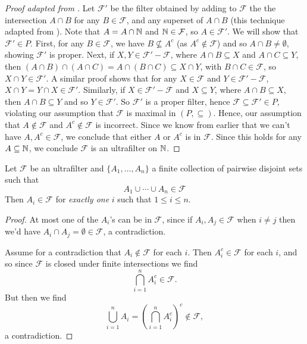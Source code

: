 \begin{proof}[Proof adapted from ]
    Let $\mathcal{F}'$ be the filter obtained by adding to $\mathcal{F}$ the the intersection $A \cap B$ for any $B \in \mathcal{F}$, and any superset of $A \cap B$ (this technique adapted from \cite[Appendix~A]{henle1979}). Note that $A = A \cap \mathbb{N}$ and $\mathbb{N} \in \mathcal{F}$, so $A \in \mathcal{F}'$. We will show that $\mathcal{F}' \in P$. First, for any $B \in \mathcal{F}$, we have $B \nsubseteq A^c$ (as $A^c \notin \mathcal{F}$) and so $A \cap B \neq \emptyset$, showing $\mathcal{F}'$ is proper. Next, if $X, Y \in \mathcal{F}' - \mathcal{F}$, where $A \cap B \subseteq X$ and $A \cap C \subseteq Y$, then $(A \cap B) \cap (A \cap C) = A \cap (B \cap C) \subseteq X \cap Y$, with $B \cap C \in \mathcal{F}$, so $X \cap Y \in \mathcal{F}'$. A similar proof shows that for any $X \in \mathcal{F}$ and $Y \in \mathcal{F}' - \mathcal{F}$, $X \cap Y = Y \cap X \in \mathcal{F}'$. Similarly, if $X \in \mathcal{F}'-\mathcal{F}$ and $X \subseteq Y$, where $A \cap B \subseteq X$, then $A \cap B \subseteq Y$ and so $Y \in \mathcal{F}'$. So $\mathcal{F}'$ is a proper filter, hence $\mathcal{F} \subseteq \mathcal{F}' \in P$, violating our assumption that $\mathcal{F}$ is maximal in $(P, \subseteq)$. Hence, our assumption that $A \notin \mathcal{F}$ and $A^c \notin \mathcal{F}$ is incorrect. Since we know from earlier that we can't have $A, A^c \in \mathcal{F}$, we conclude that either $A$ or $A^c$ is in $\mathcal{F}$. Since this holds for any $A \subseteq \mathbb{N}$, we conclude $\mathcal{F}$ is an ultrafilter on $\mathbb{N}$.
\end{proof}

\begin{thm}\label{ultrafilterDisjointUnion}
    Let $\mathcal{F}$ be an ultrafilter and $\{A_1, \ldots, A_n\}$ a finite collection of pairwise disjoint sets such that 
    \[ A_1 \cup \cdots \cup A_n \in \mathcal{F} \]
    Then $A_i \in \mathcal{F}$ for \textit{exactly one} $i$ such that $1 \leq i \leq n$.
\end{thm}

\begin{proof}
    At most one of the $A_i$'s can be in $\mathcal{F}$, since if $A_i, A_j \in \mathcal{F}$ when $i \neq j$ then we'd have $A_i \cap A_j = \emptyset \in \mathcal{F}$, a contradiction.

    Assume for a contradiction that $A_i \notin \mathcal{F}$ for each $i$. Then $A_i^c \in \mathcal{F}$ for each $i$, and so since $\mathcal{F}$ is closed under finite intersections we find
    \[ \bigcap_{i=1}^n A_i^c \in \mathcal{F}. \]
    But then we find
    \[ \bigcup_{i=1}^n A_i  = \left(\bigcap_{i=1}^n A_i^c\right)^c \notin \mathcal{F}, \]
    a contradiction.
\end{proof}

